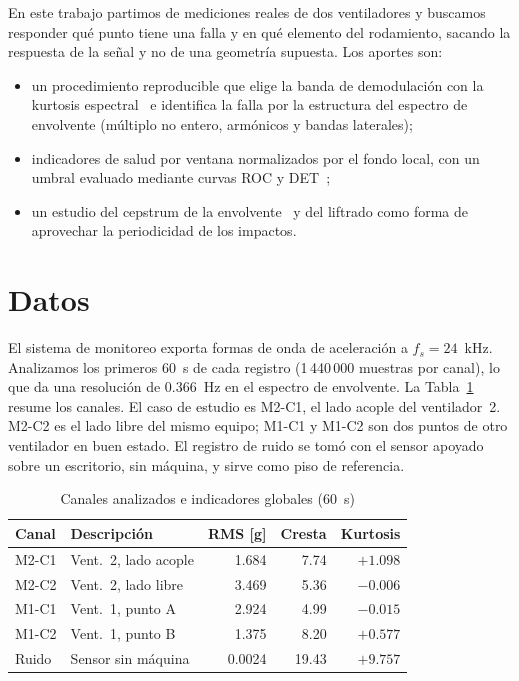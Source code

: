 \documentclass[conference,a4paper]{IEEEtran}
\begin{document}
En este trabajo partimos de mediciones reales de dos ventiladores y buscamos responder qué punto tiene una falla y en qué elemento del rodamiento, sacando la respuesta de la señal y no de una geometría supuesta. Los aportes son:
\begin{itemize}
\item un procedimiento reproducible que elige la banda de demodulación con la kurtosis espectral~\cite{antoni2006,antoni2007} e identifica la falla por la estructura del espectro de envolvente (múltiplo no entero, armónicos y bandas laterales);
\item indicadores de salud por ventana normalizados por el fondo local, con un umbral evaluado mediante curvas ROC y DET~\cite{fawcett2006,martin1997};
\item un estudio del cepstrum de la envolvente~\cite{bogert1963} y del liftrado como forma de aprovechar la periodicidad de los impactos.
\end{itemize}

\section{Datos}

El sistema de monitoreo exporta formas de onda de aceleración a $f_s=24$~kHz. Analizamos los primeros 60~s de cada registro (1\,440\,000 muestras por canal), lo que da una resolución de 0.366~Hz en el espectro de envolvente. La Tabla~\ref{tab:canales} resume los canales. El caso de estudio es M2-C1, el lado acople del ventilador~2. M2-C2 es el lado libre del mismo equipo; M1-C1 y M1-C2 son dos puntos de otro ventilador en buen estado. El registro de ruido se tomó con el sensor apoyado sobre un escritorio, sin máquina, y sirve como piso de referencia.

\begin{table}[t]
\centering
\caption{Canales analizados e indicadores globales (60~s)}
\label{tab:canales}
\begin{tabular}{@{}llrrr@{}}
\toprule
Canal & Descripción & RMS [g] & Cresta & Kurtosis \\
\midrule
M2-C1 & Vent.~2, lado acople & 1.684 & 7.74 & $+1.098$ \\
M2-C2 & Vent.~2, lado libre  & 3.469 & 5.36 & $-0.006$ \\
M1-C1 & Vent.~1, punto A     & 2.924 & 4.99 & $-0.015$ \\
M1-C2 & Vent.~1, punto B     & 1.375 & 8.20 & $+0.577$ \\
Ruido & Sensor sin máquina   & 0.0024 & 19.43 & $+9.757$ \\
\bottomrule
\end{tabular}
\end{table}
\end{document}
